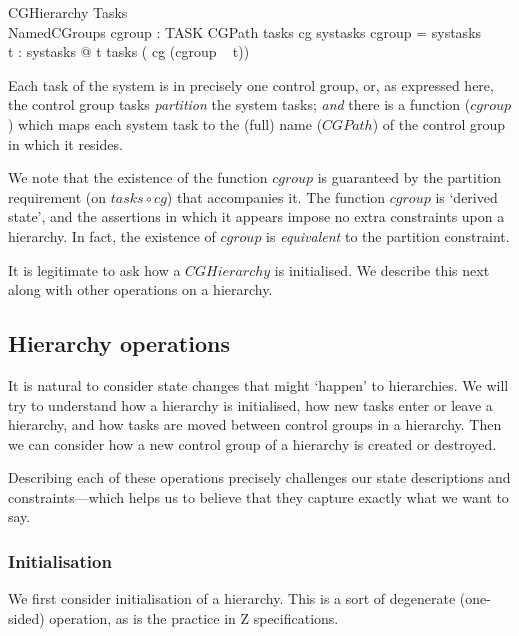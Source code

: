 \documentclass[a4paper,twoside,12pt]{article}
\begin{document}
\begin{schema}{CGHierarchy}
Tasks \\
NamedCGroups
\also
cgroup : TASK \ffun CGPath
\where
tasks \circ cg \partition systasks
\also
\dom cgroup = systasks \\
\forall t : systasks @ t \in tasks ( cg (cgroup ~ t))
\end{schema}
Each task of the system is in precisely one control group, or, as expressed here,
the control group tasks \emph{partition} the system tasks;
\emph{and} there is a function ($cgroup$) which maps each system task to the (full) name
($CGPath$) of the control group in which it resides.

We note that the existence of the function $cgroup$ is guaranteed by the partition requirement
(on $tasks \circ cg$) that accompanies it.
The function $cgroup$ is `derived state', and the assertions in which it appears impose
no extra constraints upon a hierarchy.
In fact, the existence of $cgroup$ is \emph{equivalent} to the partition constraint.

It is legitimate to ask how a $CGHierarchy$ is initialised.
We describe this next along with other operations on a hierarchy.


\subsection{Hierarchy operations}

It is natural to consider state changes that might `happen' to hierarchies.
We will try to understand how a hierarchy is initialised, how new tasks enter or leave a hierarchy,
and how tasks are moved between control groups in a hierarchy.
Then we can consider how a new control group of a hierarchy is created or destroyed.

Describing each of these operations precisely challenges our state descriptions and constraints---which helps us
to believe that they capture exactly what we want to say.

\subsubsection{Initialisation}

We first consider initialisation of a hierarchy. This is a sort of degenerate (one-sided) operation, as is the practice 
in Z specifications.
\end{document}
